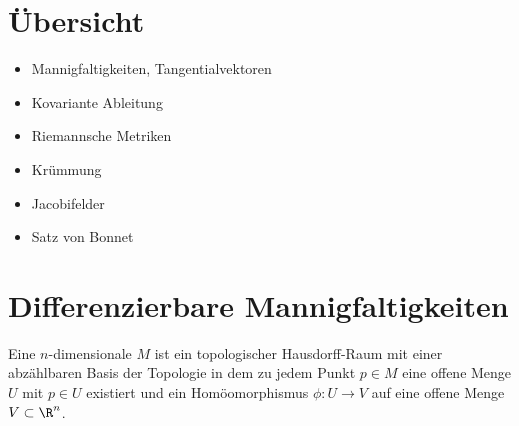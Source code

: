 
\section*{Übersicht}

\begin{itemize}
\item Mannigfaltigkeiten, Tangentialvektoren
\item Kovariante Ableitung
\item Riemannsche Metriken
\item Krümmung
\item Jacobifelder
\item Satz von Bonnet
\end{itemize}

\section{Differenzierbare Mannigfaltigkeiten}

\begin{dfn*}
  Eine $n$-dimensionale  $M$ ist ein topologischer Hausdorff-Raum mit einer abzählbaren Basis der Topologie in dem zu jedem Punkt $p \in M$ eine offene Menge $U$ mit $p \in U$ existiert und ein Homöomorphismus $\phi \colon U \to V$ auf eine offene Menge $V \subset \R^{n}$.
\end{dfn*}



